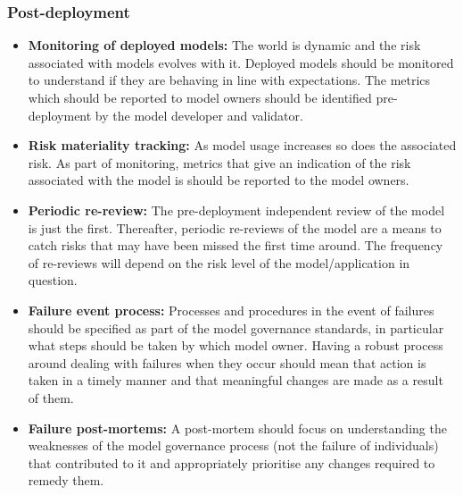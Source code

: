 \subsubsection*{Post-deployment}

\begin{itemize}[leftmargin=*]
%
\item \textbf{Monitoring of deployed models:} The world is dynamic and the risk associated with models evolves with it. Deployed models should be monitored to understand if they are behaving in line with expectations. The metrics which should be reported to model owners should be identified pre-deployment by the model developer and validator.
%
\item \textbf{Risk materiality tracking:} As model usage increases so does the associated risk. As part of monitoring, metrics that give an indication of the risk associated with the model is should be reported to the model owners.
%
\item \textbf{Periodic re-review:} The pre-deployment independent review of the model is just the first. Thereafter, periodic re-reviews of the model are a means to catch risks that may have been missed the first time around. The frequency of re-reviews will depend on the risk level of the model/application in question.
%
\item \textbf{Failure event process:} Processes and procedures in the event of failures should be specified as part of the model governance standards, in particular what steps should be taken by which model owner. Having a robust process around dealing with failures when they occur should mean that action is taken in a timely manner and that meaningful changes are made as a result of them.
%
\item \textbf{Failure post-mortems:} A post-mortem should focus on understanding the weaknesses of the model governance process (not the failure of individuals) that contributed to it and appropriately prioritise any changes required to remedy them.
%
\end{itemize}

